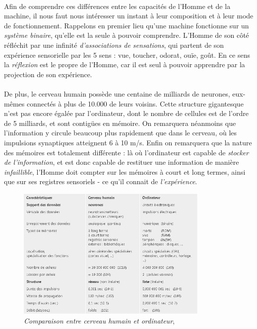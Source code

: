 \paragraph{} Afin de comprendre ces différences entre les capacités de l'Homme et de la machine, il nous faut nous
intéresser un instant à leur composition et à leur mode de fonctionnement. Rappelons en premier lieu qu'une machine
fonctionne sur un \emph{système binaire}, qu'elle est la seule à pouvoir comprendre. L'Homme de son côté réfléchit
par une infinité \emph{d'associations de sensations}, qui partent de son expérience sensorielle par les 5 sens : vue,
toucher, odorat, ouïe, goût. En ce sens la \emph{réflexion} est le propre de l'Homme, car il est seul à pouvoir 
apprendre par la projection de son expérience. \cite{Brain1}

\paragraph{} De plus, le cerveau humain possède une centaine de milliards de neurones, eux-mêmes connectés à plus de 10.000
de leurs voisins. Cette structure gigantesque n'est pas encore égalée par l'ordinateur, dont le nombre de cellules est de
l'ordre de 5 milliards, et sont contigües en mémoire. On remarquera néanmoins que l'information y circule
beaucoup plus rapidement que dans le cerveau, où les impulsions synaptiques atteignent 6 à 10 m/s. Enfin on remarquera que la
nature des mémoires est totalement différente : là où l'ordinateur est capable de \emph{stocker de l'information}, et est donc
capable de restituer une information de manière \emph{infaillible}, l'Homme doit compter sur les mémoires à court et long termes,
ainsi que sur ses registres sensoriels - ce qu'il connait de \emph{l'expérience}. \cite{Brain0}

\begin{figure}[h]
    \centering
    \includegraphics[width=350px]{chapters/03/images/cerveau-robot.jpg}
    \caption{\label{comparatif}\emph{Comparaison entre cerveau humain et ordinateur}, \cite{Brain1}}
\end{figure}

